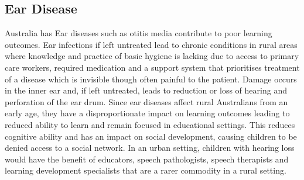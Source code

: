  
\subsection{Ear Disease} 
Australia has Ear diseases such as otitis media contribute to poor learning outcomes\cite{williams2009impact}.  Ear infections if left untreated lead to chronic conditions in rural areas where knowledge and practice of basic hygiene is lacking due to access to primary care workers, required medication and a support system that prioritises treatment of a disease which is invisible  though often painful to the patient. Damage occurs in the inner ear and, if left untreated, leads to reduction or loss of hearing and perforation of the ear drum. Since ear diseases affect rural Australians from an early age, they have a disproportionate impact on learning outcomes leading to reduced ability to learn and remain focused in educational settings. This reduces cognitive ability and has an impact on social development, causing children to be denied access to a social network. In an urban setting, children with hearing loss would have the benefit of educators, speech pathologists, speech therapists and learning development specialists that are a rarer commodity in a rural setting. 

